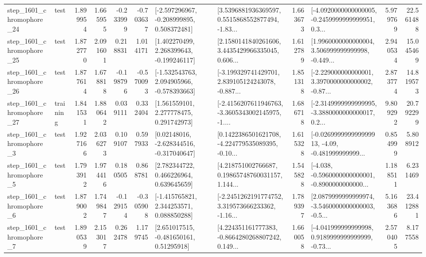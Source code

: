 \begin{tabular}{llrrrrllrlrr}
 step\_1601\_chromophore\_24 &      test &      1.899954 &    1.665955 &     -0.233999 & -0.703637 &   [-2.597296967, -0.208999895, 0.508372481] &  [3.5396881936369597, 0.5515868552877494, -1.83... &       1.663673 &  [-4.0920000000000005, -0.2459999999999951, 0.3... &            5.979769 &         22.561488 \\
 step\_1601\_chromophore\_25 &      test &      1.872770 &    2.091601 &      0.218831 &  1.014171 &    [1.402270499, 2.268399643, -0.199246117] &  [2.1580141840261606, 3.4435429966335045, 0.606... &       1.612789 &  [1.9960000000000004, 3.506999999999998, -0.449... &            2.940534 &         15.045469 \\
 step\_1601\_chromophore\_26 &      test &      1.877614 &    1.678818 &     -0.198796 & -0.570093 &   [-1.532543763, 2.094905966, -0.578393663] &  [-3.199329741429701, 2.839105124243078, -0.887... &       1.851318 &  [-2.229000000000001, 3.3970000000000002, -0.87... &            2.873774 &         14.819573 \\
 step\_1601\_chromophore\_27 &  training &      1.841531 &    1.880642 &      0.039111 &  0.332404 &     [1.561559101, 2.277778475, 0.291742973] &  [-2.4156207611946763, -3.3605343002145975, -1.... &       1.686718 &  [-2.3149999999999995, -3.3880000000000017, 0.2... &            9.809292 &         20.792299 \\
  step\_1601\_chromophore\_3 &      test &      1.927166 &    2.036273 &      0.109107 &  0.597933 &    [0.02148016, -2.628344516, -0.317040647] &  [0.1422386501621708, -4.224779535089395, -0.10... &       1.615328 &  [-0.026999999999999913, -4.09, -0.481999999999... &            0.854999 &          5.808912 \\
  step\_1601\_chromophore\_5 &      test &      1.793912 &    1.974416 &      0.180505 &  0.868781 &     [2.782344722, 0.466226964, 0.639645659] &  [4.218751002766687, 0.19865748760031157, 1.144... &       1.545828 &  [-4.038, -0.5960000000000001, -0.8900000000000... &            1.188511 &          6.231469 \\
  step\_1601\_chromophore\_6 &      test &      1.879002 &    1.749847 &     -0.129154 & -0.305908 &    [-1.415765821, 2.344253571, 0.088850288] &  [-2.2451262191774752, 3.319573666233362, -1.16... &       1.789397 &  [2.0879999999999974, -3.5460000000000003, -0.5... &            5.163686 &         23.412881 \\
  step\_1601\_chromophore\_7 &      test &      1.890539 &    2.153017 &      0.262478 &  1.179745 &     [2.651017515, -0.481650161, 0.51295918] &  [4.224351161777383, -0.8664280268807242, 0.149... &       1.660058 &  [-4.041999999999998, 0.9189999999999999, -0.73... &            2.570405 &          8.177558 \\

\end{tabular}
